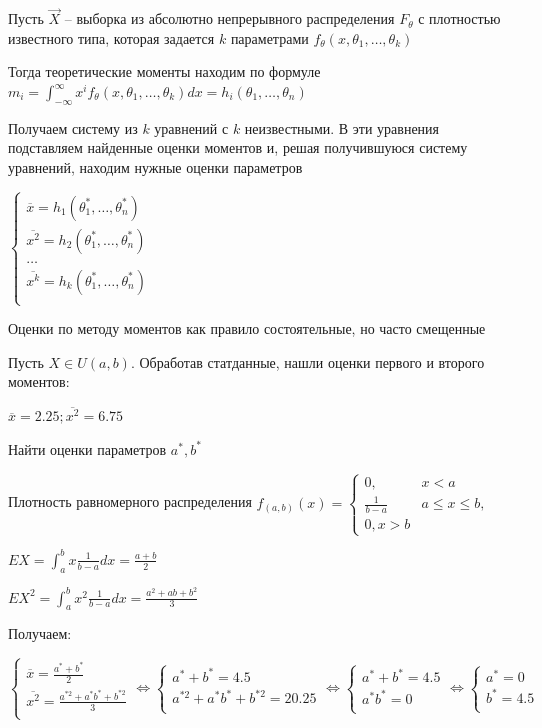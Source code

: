 Пусть $\vec{X}$ -- выборка из абсолютно непрерывного распределения $F_\theta$ с плотностью известного типа, 
которая задается $k$ параметрами $f_\theta (x, \theta_1, \dots, \theta_k)$

Тогда теоретические моменты находим по формуле $m_i = \int_{-\infty}^{\infty} x^i f_\theta (x, \theta_1, \dots, \theta_k) dx = h_i(\theta_1, \dots, \theta_n)$

Получаем систему из $k$ уравнений с $k$ неизвестными. В эти уравнения подставляем найденные оценки
моментов и, решая получившуюся систему уравнений, находим нужные оценки параметров

$\begin{cases}
    \overline{x} = h_1(\theta_1^*, \dots, \theta_n^*) \\ 
    \overline{x^2} = h_2(\theta_1^*, \dots, \theta_n^*) \\ 
    \dots \\
    \overline{x^k} = h_k(\theta_1^*, \dots, \theta_n^*) \\ 
\end{cases}$

\Nota Оценки по методу моментов как правило состоятельные, но часто смещенные

\Ex Пусть $X \in U(a, b)$. Обработав статданные, нашли оценки первого и второго моментов:

$\overline{x} = 2.25; \overline{x^2} = 6.75$

Найти оценки параметров $a^*, b^*$

Плотность равномерного распределения $f_{(a, b)} (x) = \begin{cases}0, & x < a \\ \frac{1}{b - a} & a \leq x \leq b, \\ 0, x > b\end{cases}$

$EX = \int_a^b x \frac{1}{b - a} dx = \frac{a + b}{2}$

$EX^2 = \int_a^b x^2 \frac{1}{b - a} dx = \frac{a^2 + ab + b^2}{3}$

\mediumvspace

Получаем:

$\begin{cases}
    \overline{x} = \frac{a^* + b^*}{2} \\ 
    \overline{x^2} = \frac{a^{*2} + a^* b^* + b^{*2}}{3} \\ 
\end{cases} \Longleftrightarrow \begin{cases}
    a^* + b^* = 4.5 \\ 
    a^{*2} + a^* b^* + b^{*2} = 20.25 \\ 
\end{cases} \Longleftrightarrow \begin{cases}
    a^* + b^* = 4.5 \\ 
    a^* b^* = 0 \\ 
\end{cases} \Longleftrightarrow \begin{cases}
    a^* = 0 \\ 
    b^* = 4.5 \\ 
\end{cases}$



